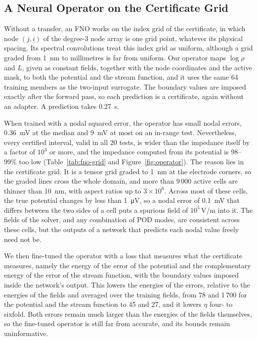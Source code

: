 \documentclass[11pt]{article}
\begin{document}
\subsection{A Neural Operator on the Certificate Grid}\label{sec:fno-grid}
Without a transfer, an FNO works on the index grid of the certificate, in which node
$(j,i)$ of the degree-3 node array is one grid point, whatever its physical spacing.
Its spectral convolutions treat this index grid as uniform, although a grid graded
from \SI{1}{nm} to millimetres is far from uniform. Our operator maps $\log\rho$ and
$L$, given as constant fields, together with the node coordinates and the active
mask, to both the potential and the stream function, and it uses the same 64
training members as the two-input surrogate. The boundary values are imposed exactly
after the forward pass, so each prediction is a certificate, again without an
adapter. A prediction takes \SI{0.27}{s}.

When trained with a nodal squared error, the operator has small nodal errors,
\SI{0.36}{mV} at the median and \SI{9}{mV} at most on an in-range test.
Nevertheless, every certified interval, valid in all 20 tests, is wider than the
impedance itself by a factor of $10^3$ or more, and the impedance computed from its
potential is 98--99\% too low (Table~\ref{tab:fno-grid} and
Figure~\ref{fig:operator}). The reason lies in the certificate grid. It is a tensor
grid graded to \SI{1}{nm} at the electrode corners, so the graded lines cross the
whole domain, and more than 9\,000 active cells are thinner than \SI{10}{nm}, with
aspect ratios up to $3\times10^6$. Across most of these cells, the true potential
changes by less than \SI{1}{\micro V}, so a nodal error of \SI{0.1}{mV} that differs
between the two sides of a cell puts a spurious field of $10^5$\,V/m into it. The
fields of the solver, and any combination of POD modes, are consistent across these
cells, but the outputs of a network that predicts each nodal value freely need not
be.

We then fine-tuned the operator with a loss that measures what the certificate
measures, namely the energy of the error of the potential and the complementary
energy of the error of the stream function, with the boundary values imposed inside
the network's output. This lowers the energies of the errors, relative to the
energies of the fields and averaged over the training fields, from 78 and 1\,700 for the potential and the stream function to 45
and 27, and it lowers $\eta$ four- to sixfold. Both errors remain much larger than
the energies of the fields themselves, so the fine-tuned operator is still far from
accurate, and its bounds remain uninformative.
\end{document}
